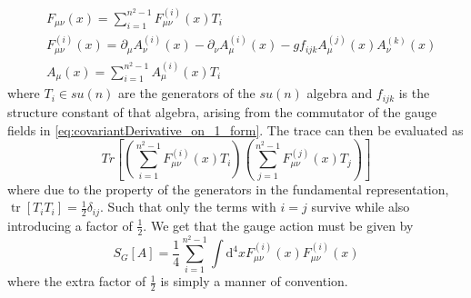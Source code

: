 \documentclass[a4paper,10pt]{article}
\begin{document}
\begin{equation}
\begin{aligned}
&F_{\mu \nu}(x)=\sum_{i=1}^{n^2-1} F_{\mu \nu}^{(i)}(x) T_{i} \\
&F_{\mu \nu}^{(i)}(x)=\partial_{\mu} A_{\nu}^{(i)}(x)-\partial_{\nu} A_{\mu}^{(i)}(x)-gf_{i j k} A_{\mu}^{(j)}(x) A_{\nu}^{(k)}(x)\\
&A_{\mu}(x)=\sum_{i=1}^{n^2-1} A_{\mu}^{(i)}(x) T_{i}
\end{aligned}
\end{equation}
where $T_i \in su(n)$ are the generators of the $su(n)$ algebra and $f_{ijk}$ is the structure constant of that algebra, arising from the commutator of the gauge fields in \eqref{eq:covariantDerivative_on_1_form}. The trace can then be evaluated as
\begin{equation}
Tr\left[ \left( \sum_{i=1}^{n^2-1} F_{\mu \nu}^{(i)}(x) T_{i} \right)\left( \sum_{j=1}^{n^2-1} F_{\mu \nu}^{(j)}(x) T_{j} \right) \right]
\end{equation}
where due to the property of the generators in the fundamental representation, $\operatorname{tr}\left[T_{i} T_{i}\right]=\frac{1}{2} \delta_{i j}$. Such that only the terms with $i=j$ survive while also introducing a factor of $\frac{1}{2}$. We get that the gauge action must be given by 
\begin{equation}\label{eq:continuum_gaugeAction}
S_{G}[A]=\frac{1}{4} \sum_{i=1}^{n^2-1} \int \mathrm{d}^{4} x F_{\mu \nu}^{(i)}(x) F_{\mu \nu}^{(i)}(x)
\end{equation}
where the extra factor of $\frac{1}{2}$ is simply a manner of convention.
\end{document}
